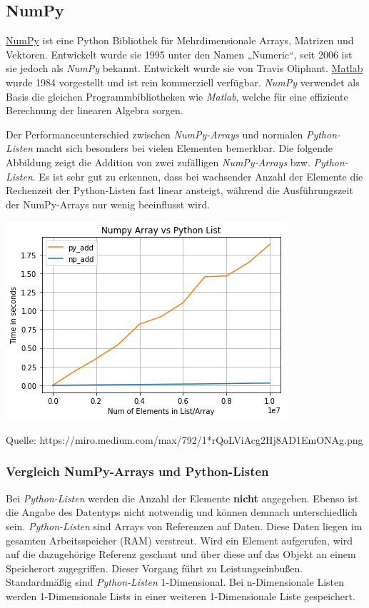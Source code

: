 \documentclass[11pt]{article}
\begin{document}
    \hypertarget{numpy}{%
\subsection{NumPy}\label{numpy}}

\href{https://numpy.org/}{NumPy} ist eine Python Bibliothek für
Mehrdimensionale Arrays, Matrizen und Vektoren. Entwickelt wurde sie
1995 unter den Namen „Numeric``, seit 2006 ist sie jedoch als
\emph{NumPy} bekannt. Entwickelt wurde sie von Travis Oliphant.
\href{https://de.mathworks.com/products/matlab.html}{Matlab} wurde 1984
vorgestellt und ist rein kommerziell verfügbar. \emph{NumPy} verwendet
als Basis die gleichen Programmbibliotheken wie \emph{Matlab}, welche
für eine effiziente Berechnung der linearen Algebra sorgen.

Der Performanceunterschied zwischen \emph{NumPy-Arrays} und normalen
\emph{Python-Listen} macht sich besonders bei vielen Elementen
bemerkbar. Die folgende Abbildung zeigt die Addition von zwei zufälligen
\emph{NumPy-Arrays} bzw. \emph{Python-Listen}. Es ist sehr gut zu
erkennen, dass bei wachsender Anzahl der Elemente die Rechenzeit der
Python-Listen fast linear ansteigt, während die Ausführungszeit der
NumPy-Arrays nur wenig beeinflusst wird.

\includegraphics{images/vergleich_array_list.png}

Quelle: https://miro.medium.com/max/792/1*rQoLViAcg2Hj8AD1EmONAg.png

\hypertarget{vergleich-numpy-arrays-und-python-listen}{%
\subsubsection{Vergleich NumPy-Arrays und
Python-Listen}\label{vergleich-numpy-arrays-und-python-listen}}

Bei \emph{Python-Listen} werden die Anzahl der Elemente \textbf{nicht}
angegeben. Ebenso ist die Angabe des Datentyps nicht notwendig und
können demnach unterschiedlich sein. \emph{Python-Listen} sind Arrays
von Referenzen auf Daten. Diese Daten liegen im gesamten Arbeitsspeicher
(RAM) verstreut. Wird ein Element aufgerufen, wird auf die dazugehörige
Referenz geschaut und über diese auf das Objekt an einem Speicherort
zugegriffen. Dieser Vorgang führt zu Leistungseinbußen. Standardmäßig
sind \emph{Python-Listen} 1-Dimensional. Bei n-Dimensionale Listen
werden 1-Dimensionale Lists in einer weiteren 1-Dimensionale Liste
gespeichert.
\end{document}
